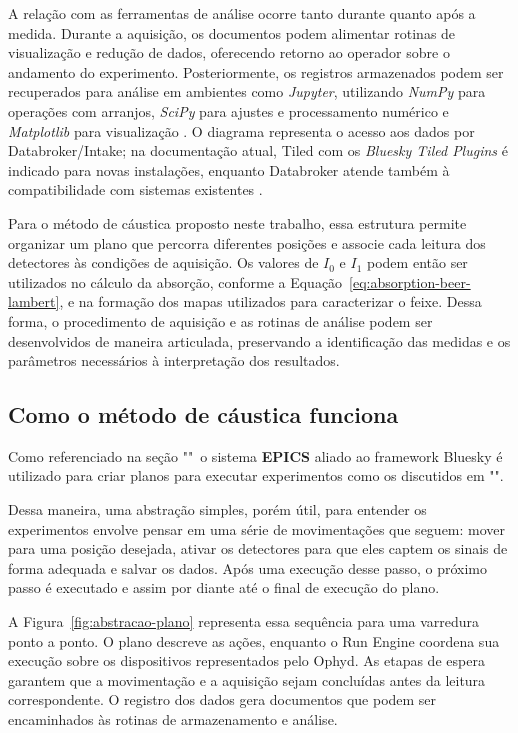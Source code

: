 \documentclass[12pt,a4paper]{article}
\makeatletter
\newcommand{\rotulosecao}[2]{%
    \phantomsection
    \def\@currentlabelname{#2}%
    \label{#1}%
}
\makeatother
\begin{document}
A relação com as ferramentas de análise ocorre tanto durante quanto após a medida. Durante a aquisição, os documentos podem alimentar rotinas de visualização e redução de dados, oferecendo retorno ao operador sobre o andamento do experimento. Posteriormente, os registros armazenados podem ser recuperados para análise em ambientes como \textit{Jupyter}, utilizando \textit{NumPy} para operações com arranjos, \textit{SciPy} para ajustes e processamento numérico e \textit{Matplotlib} para visualização \cite{bluesky_framework}. O diagrama representa o acesso aos dados por Databroker/Intake; na documentação atual, Tiled com os \textit{Bluesky Tiled Plugins} é indicado para novas instalações, enquanto Databroker atende também à compatibilidade com sistemas existentes \cite{databroker_documentacao}.

Para o método de cáustica proposto neste trabalho, essa estrutura permite organizar um plano que percorra diferentes posições e associe cada leitura dos detectores às condições de aquisição. Os valores de $I_0$ e $I_1$ podem então ser utilizados no cálculo da absorção, conforme a Equação~\ref{eq:absorption-beer-lambert}, e na formação dos mapas utilizados para caracterizar o feixe. Dessa forma, o procedimento de aquisição e as rotinas de análise podem ser desenvolvidos de maneira articulada, preservando a identificação das medidas e os parâmetros necessários à interpretação dos resultados.

\subsection*{Como o método de cáustica funciona}
\rotulosecao{sec:metodo-caustica}{Como o método de cáustica funciona}

Como referenciado na seção ""\ o sistema \textbf{EPICS} aliado ao framework Bluesky é utilizado para criar planos para executar experimentos como os discutidos em "".

Dessa maneira, uma abstração simples, porém útil, para entender os experimentos envolve pensar em uma série de movimentações que seguem: mover para uma posição desejada, ativar os detectores para que eles captem os sinais de forma adequada e salvar os dados. 
Após uma execução desse passo, o próximo passo é executado e assim por diante até o final de execução do plano.

A Figura~\ref{fig:abstracao-plano} representa essa sequência para uma varredura ponto a ponto. O plano descreve as ações, enquanto o Run Engine coordena sua execução sobre os dispositivos representados pelo Ophyd. As etapas de espera garantem que a movimentação e a aquisição sejam concluídas antes da leitura correspondente. O registro dos dados gera documentos que podem ser encaminhados às rotinas de armazenamento e análise.
\end{document}
